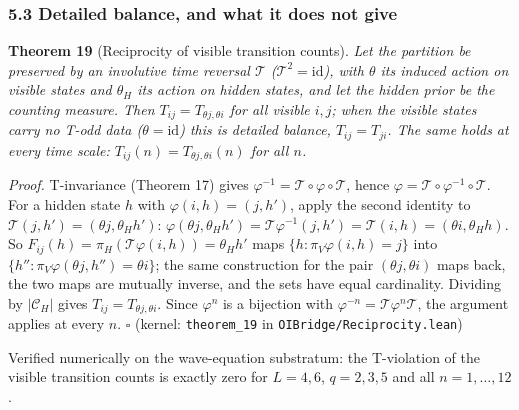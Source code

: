 \documentclass[
]{article}
\begin{document}
\hypertarget{detailed-balance-and-what-it-does-not-give}{%
\subsubsection{5.3 Detailed balance, and what it does not
give}\label{detailed-balance-and-what-it-does-not-give}}

\textbf{Theorem 19} (Reciprocity of visible transition counts).
\emph{Let the partition be preserved by an involutive time reversal
\(\mathcal{T}\) (\(\mathcal{T}^2 = \mathrm{id}\)), with \(\theta\) its
induced action on visible states and \(\theta_H\) its action on hidden
states, and let the hidden prior be the counting measure. Then
\(T_{ij} = T_{\theta j,\theta i}\) for all visible \(i, j\); when the
visible states carry no T-odd data (\(\theta=\mathrm{id}\)) this is
detailed balance, \(T_{ij}=T_{ji}\). The same holds at every time scale:
\(T_{ij}(n)=T_{\theta j,\theta i}(n)\) for all \(n\).}

\emph{Proof.} T-invariance (Theorem 17) gives
\(\varphi^{-1} = \mathcal{T} \circ \varphi \circ \mathcal{T}\), hence
\(\varphi=\mathcal T\circ\varphi^{-1}\circ\mathcal T\). For a hidden
state \(h\) with \(\varphi(i,h)=(j,h')\), apply the second identity to
\(\mathcal T(j,h')=(\theta j,\theta_H h')\):
\(\varphi(\theta j,\theta_H h')=\mathcal T\varphi^{-1}(j,h')=\mathcal T(i,h)=(\theta i,\theta_H h)\).
So \(F_{ij}(h)=\pi_H(\mathcal T\varphi(i,h))=\theta_H h'\) maps
\(\{h : \pi_V\varphi(i,h) = j\}\) into
\(\{h'' : \pi_V\varphi(\theta j,h'') = \theta i\}\); the same
construction for the pair \((\theta j,\theta i)\) maps back, the two
maps are mutually inverse, and the sets have equal cardinality. Dividing
by \(|\mathcal{C}_H|\) gives \(T_{ij} = T_{\theta j,\theta i}\). Since
\(\varphi^n\) is a bijection with
\(\varphi^{-n}=\mathcal T\varphi^n\mathcal T\), the argument applies at
every \(n\). \(\square\) (kernel: \texttt{theorem\_19} in
\texttt{OIBridge/Reciprocity.lean})

Verified numerically on the wave-equation substratum: the T-violation of
the visible transition counts is exactly zero for \(L = 4, 6\),
\(q = 2, 3, 5\) and all \(n = 1, \dots, 12\).
\end{document}
